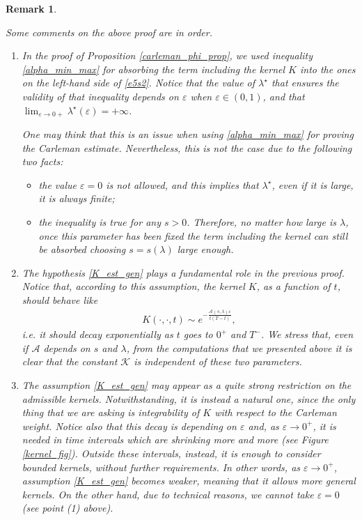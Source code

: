 \documentclass{amsart}    %
\newtheorem{remark}{\bf Remark}[section]
\begin{document}
\begin{remark}\label{rem_lambda}
	
Some comments on the above proof are in order. 	

\begin{enumerate}
	\item In the proof of Proposition \ref{carleman_phi_prop}, we used inequality \eqref{alpha_min_max} for absorbing the term including the kernel $K$ into the ones on the left-hand side of \eqref{e5s2}. Notice that the value of $\lambda^\star$ that ensures the validity of that inequality depends on $\varepsilon$ when $\varepsilon\in(0,1)$, and that ${\lim_{\varepsilon\to 0+}\lambda^\star(\varepsilon)=+\infty}$. 
	
	One may think that this is an issue when using \eqref{alpha_min_max} for proving the Carleman estimate. Nevertheless, this is not the case due to the following two facts:
	\begin{itemize}
		\item the value $\varepsilon=0$ is not allowed, and this implies that $\lambda^\star$, even if it is large, it is always finite;
		\item the inequality is true for any $s>0$. Therefore, no matter how large is $\lambda$, once this parameter has been fixed the term including the kernel can still be absorbed choosing $s=s(\lambda)$ large enough. 
	\end{itemize}
	
	\item The hypothesis \eqref{K_est_gen} plays a fundamental role in the previous proof. Notice that, according to this assumption, the kernel $K$, as a function of $t$, should behave like 
	\begin{align*}
		K(\cdot,\cdot,t)\sim e^{-\frac{\mathcal{A}(s,\lambda)\varepsilon}{t(T-t)}},
	\end{align*}
	i.e. it should decay exponentially as $t$ goes to $0^+$ and $T^-$. We stress that, even if $\mathcal{A}$ depends on $s$ and $\lambda$, from the computations that we presented above it is clear that the constant $\mathcal{K}$ is independent of these two parameters.
	
	\item  The assumption \eqref{K_est_gen} may appear as a quite strong restriction on the admissible kernels. Notwithstanding, it is instead a natural one, since the only thing that we are asking is integrability of $K$ with respect to the Carleman weight. Notice also that this decay is depending on $\varepsilon$ and, as $\varepsilon\to 0^+$, it is needed in time intervals which are shrinking more and more (see Figure \ref{kernel_fig}). Outside these intervals, instead, it is enough to consider bounded kernels, without further requirements. In other words, as $\varepsilon\to 0^+$, assumption \eqref{K_est_gen} becomes weaker, meaning that it allows more general kernels. On the other hand, due to technical reasons, we cannot take $\varepsilon=0$ (see point (1) above). 
	

\end{enumerate}
\end{remark}
\end{document}
